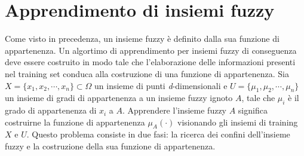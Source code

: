 \documentclass [11pt,a4paper,twoside,openright] {book}
\begin{document}
\chapter{Apprendimento di insiemi fuzzy}\label{malchiodi}
Come visto in precedenza, un insieme fuzzy è definito dalla sua funzione di appartenenza. Un algortimo di apprendimento per insiemi fuzzy di conseguenza deve essere costruito in modo tale che l'elaborazione delle informazioni presenti nel training set conduca alla costruzione di una funzione di appartenenza.
Sia $X=\lbrace x_1, x_2, \cdots, x_n \rbrace \subset \Omega$ un insieme di punti \textit{d}-dimensionali e $U=\lbrace \mu_1, \mu_2, \cdots, \mu_n \rbrace$ un insieme di gradi di appartenenza a un insieme fuzzy ignoto $A$, tale che $\mu_i$ è il grado di appartenenza di $x_i$ a $A$. Apprendere l'insieme fuzzy $A$ significa costruirne la funzione di appartenenza $\mu_A(\cdot)$ visionando gli insiemi di training $X$ e $U$. Questo problema \cite{malchiodi2013learning} consiste in due fasi: la ricerca dei confini dell'insieme fuzzy e la costruzione della sua funzione di appartenenza.
\end{document}
